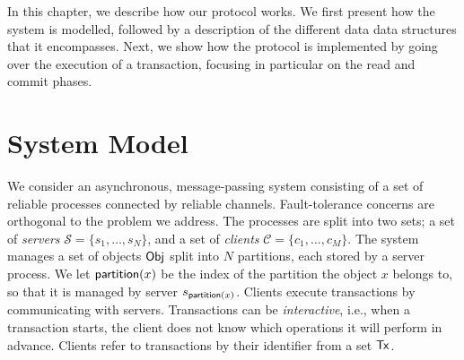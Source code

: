 \newcommand{\parti}{\mathit{p_i}}
\newcommand{\partj}{\mathit{s_j}}

\newcommand{\transtype}{{\sf Tx}}
\newcommand{\keytype}{{\sf Object}}
\newcommand{\valuetype}{{\sf Value}}
\newcommand{\vctype}{{\sf VerVector}}

\newcommand{\val}{{\sf val}}

\newcommand{\tx}{\ensuremath{\mathit{T}}}

\newcommand{\commitVC}{\mathit{Vcomm}}

\newcommand{\localkey}{{\sf k}}
\newcommand{\localval}{{\sf v}}
\newcommand{\partitionof}{{\sf partition}}

\newcommand{\SubAlgo}[2]{#1 \SubAlgoBlock{#2}}





In this chapter, we describe how our protocol works. We first present how the system is modelled, followed by a description of the different data data structures that it encompasses. Next, we show how the protocol is implemented by going over the execution of a transaction, focusing in particular on the read and commit phases.

\section{System Model}

We consider an asynchronous, message-passing system consisting of a set of reliable processes connected by reliable channels. Fault-tolerance concerns are orthogonal to the problem we address. The processes are split into two sets; a set of \emph{servers} $\mathcal{S} = \{s_1, \dots, s_N\}$, and a set of \emph{clients} $\mathcal{C} = \{c_1, \dots, c_M\}$. The system manages a set of objects ${\sf Obj}$ split into $N$ partitions, each stored by a server process. We let $\mathsf{partition}(x)$ be the index of the partition the object $x$ belongs to, so that it is managed by server $s_{\mathsf{partition}(x)}$. Clients execute transactions by communicating with servers. Transactions can be \emph{interactive}, i.e., when a transaction starts, the client does not know which operations it will perform in advance. Clients refer to transactions by their identifier from a set $\transtype$.

